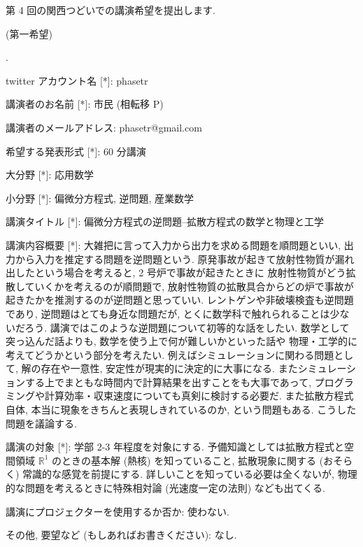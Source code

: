 \documentclass[openany, a4paper, oneside]{jsbook}
\newcounter{enum2}
\renewenvironment{enumerate}{%
\begin{list}%
{%
\arabic{enum2}.\ \,%
}%
{%
\usecounter{enum2}
\setlength{\itemindent}{0pt}%
\setlength{\leftmargin}{15pt}%
\setlength{\rightmargin}{0pt}%
\setlength{\labelsep}{0pt}%
\setlength{\labelwidth}{6pt}%
\setlength{\itemsep}{0pt}%
\setlength{\parsep}{0pt}%
\setlength{\listparindent}{0pt}%
}
}{%
\end{list}%
}
\theoremstyle{break}
\theoremstyle{breakdefn}
\begin{document}
第 4 回の関西つどいでの講演希望を提出します.

(第一希望)
\begin{enumerate}
\item twitter アカウント名 [*]: phasetr
\item 講演者のお名前 [*]: 市民 (相転移 P)
\item 講演者のメールアドレス: phasetr@gmail.com
\item 希望する発表形式 [*]: 60 分講演
\item 大分野 [*]: 応用数学
\item 小分野 [*]: 偏微分方程式, 逆問題, 産業数学
\item 講演タイトル [*]: 偏微分方程式の逆問題--拡散方程式の数学と物理と工学
\item 講演内容概要 [*]: 大雑把に言って入力から出力を求める問題を順問題といい,
   出力から入力を推定する問題を逆問題という.
   原発事故が起きて放射性物質が漏れ出したという場合を考えると, 2 号炉で事故が起きたときに
   放射性物質がどう拡散していくかを考えるのが順問題で,
   放射性物質の拡散具合からどの炉で事故が起きたかを推測するのが逆問題と思っていい.
   レントゲンや非破壊検査も逆問題であり,
   逆問題はとても身近な問題だが, とくに数学科で触れられることは少ないだろう.
   講演ではこのような逆問題について初等的な話をしたい.
   数学として突っ込んだ話よりも, 数学を使う上で何が難しいかといった話や
   物理・工学的に考えてどうかという部分を考えたい.
   例えばシミュレーションに関わる問題として, 解の存在や一意性, 安定性が現実的に決定的に大事になる.
   またシミュレーションする上でまともな時間内で計算結果を出すことをも大事であって,
   プログラミングや計算効率・収束速度についても真剣に検討する必要だ.
   また拡散方程式自体, 本当に現象をきちんと表現しきれているのか, という問題もある.
   こうした問題を議論する.
\item 講演の対象 [*]: 学部 2-3 年程度を対象にする.
   予備知識としては拡散方程式と空間領域 $\mathbb{R}^1$ のときの基本解 (熱核) を知っていること,
   拡散現象に関する (おそらく) 常識的な感覚を前提にする.
   詳しいことを知っている必要は全くないが,
   物理的な問題を考えるときに特殊相対論 (光速度一定の法則) なども出てくる.
\item 講演にプロジェクターを使用するか否か: 使わない.
\item その他, 要望など (もしあればお書きください): なし.
\end{enumerate}
\end{document}
